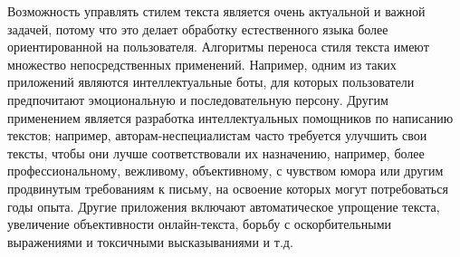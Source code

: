 \Introduction






Возможность управлять стилем текста является очень актуальной и важной задачей, потому что это делает обработку естественного языка более ориентированной на пользователя.
Алгоритмы переноса стиля текста имеют множество непосредственных применений.
Например, одним из таких приложений являются интеллектуальные боты, для которых
пользователи предпочитают эмоциональную и последовательную персону.
Другим применением является разработка интеллектуальных помощников по написанию текстов;
например, авторам-неспециалистам часто требуется улучшить свои тексты, чтобы они лучше соответствовали их назначению, например, более профессиональному, вежливому, объективному, с чувством юмора или другим продвинутым требованиям к письму, на освоение которых могут потребоваться годы опыта.
Другие приложения включают автоматическое упрощение текста, увеличение объективности онлайн-текста, борьбу с оскорбительными выражениями и токсичными высказываниями и т.д.

